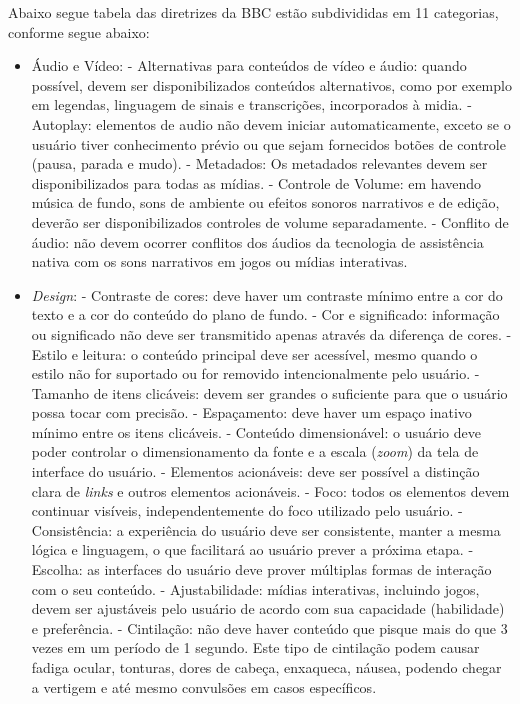 Abaixo segue tabela das diretrizes da BBC estão subdivididas em 11 categorias, conforme segue abaixo:

\begin{itemize}
	\item Áudio e Vídeo:
		\subitem - Alternativas para conteúdos de vídeo e áudio: quando possível, devem ser disponibilizados conteúdos alternativos, como por exemplo em legendas, linguagem de sinais e transcrições, incorporados à midia.
		\subitem - Autoplay: elementos de audio não devem iniciar automaticamente, exceto se o usuário tiver conhecimento prévio ou que sejam fornecidos botões de controle (pausa, parada e mudo).
		\subitem - Metadados: Os metadados relevantes devem ser disponibilizados para todas as mídias.
		\subitem - Controle de Volume: em havendo música de fundo, sons de ambiente ou efeitos sonoros narrativos e de edição, deverão ser disponibilizados controles de volume separadamente.
		\subitem - Conflito de áudio: não devem ocorrer conflitos dos áudios da tecnologia de assistência nativa com os sons narrativos em jogos ou mídias interativas.
	\item \textit{Design}:
		\subitem - Contraste de cores: deve haver um contraste mínimo entre a cor do texto e a cor do conteúdo do plano de fundo.
		\subitem - Cor e significado: informação ou significado não deve ser transmitido apenas através da diferença de cores.
		\subitem - Estilo e leitura: o conteúdo principal deve ser acessível, mesmo quando o estilo não for suportado ou for removido intencionalmente pelo usuário.
		\subitem - Tamanho de itens clicáveis: devem ser grandes o suficiente para que o usuário possa tocar com precisão.
		\subitem - Espaçamento: deve haver um espaço inativo mínimo entre os itens clicáveis.
		\subitem - Conteúdo dimensionável: o usuário deve poder controlar o dimensionamento da fonte e a escala (\textit{zoom}) da tela de interface do usuário.
		\subitem - Elementos acionáveis: deve ser possível a distinção clara de \textit{links} e outros elementos acionáveis.
		\subitem - Foco: todos os elementos devem continuar visíveis, independentemente do foco utilizado pelo usuário.
		\subitem - Consistência: a experiência do usuário deve ser consistente, manter a mesma lógica e linguagem, o que facilitará ao usuário prever a próxima etapa.
		\subitem - Escolha: as interfaces do usuário deve prover múltiplas formas de interação com o seu conteúdo.
		\subitem - Ajustabilidade: mídias interativas, incluindo jogos, devem ser ajustáveis pelo usuário de acordo com sua capacidade (habilidade) e preferência.
		\subitem - Cintilação: não deve haver conteúdo que pisque mais do que 3 vezes em um período de 1 segundo. Este tipo de cintilação podem causar fadiga ocular, tonturas, dores de cabeça, enxaqueca, náusea, podendo chegar a vertigem e até mesmo convulsões em casos específicos.

\end{itemize}
